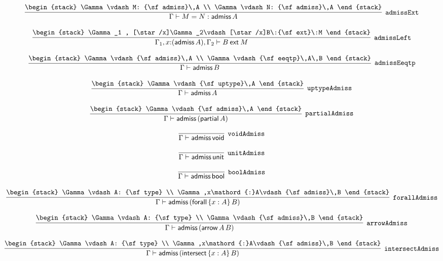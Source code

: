 \[
\infer[{\tt admissExt}]{\Gamma \vdash M= N: {\sf admiss}\,A}{
\begin{stack}
\Gamma \vdash M: {\sf admiss}\,A
\\
\Gamma \vdash N: {\sf admiss}\,A
\end{stack}}
\]

\[
\infer[{\tt admissLeft}]{\Gamma_1 ,x\mathord{:}({\sf admiss}\,A), \Gamma_2 \vdash B\:{\sf ext}\:M}{
\begin{stack}
\Gamma_1 , [\star /x]\Gamma_2\vdash [\star /x]B\:{\sf ext}\:M
\end{stack}}
\]

\[
\infer[{\tt admissEeqtp}]{\Gamma \vdash {\sf admiss}\,B}{
\begin{stack}
\Gamma \vdash {\sf admiss}\,A
\\
\Gamma \vdash {\sf eeqtp}\,A\,B
\end{stack}}
\]

\[
\infer[{\tt uptypeAdmiss}]{\Gamma \vdash {\sf admiss}\,A}{
\begin{stack}
\Gamma \vdash {\sf uptype}\,A
\end{stack}}
\]

\[
\infer[{\tt partialAdmiss}]{\Gamma \vdash {\sf admiss}\,({\sf partial}\,A)}{
\begin{stack}
\Gamma \vdash {\sf admiss}\,A
\end{stack}}
\]

\[
\infer[{\tt voidAdmiss}]{\Gamma \vdash {\sf admiss}\,{\sf void}}{}
\]

\[
\infer[{\tt unitAdmiss}]{\Gamma \vdash {\sf admiss}\,{\sf unit}}{}
\]

\[
\infer[{\tt boolAdmiss}]{\Gamma \vdash {\sf admiss}\,{\sf bool}}{}
\]

\[
\infer[{\tt forallAdmiss}]{\Gamma \vdash {\sf admiss}\,({\sf forall}\,\{x : A\}\,B)}{
\begin{stack}
\Gamma \vdash A: {\sf type}
\\
\Gamma ,x\mathord{:}A\vdash {\sf admiss}\,B
\end{stack}}
\]

\[
\infer[{\tt arrowAdmiss}]{\Gamma \vdash {\sf admiss}\,({\sf arrow}\,A\,B)}{
\begin{stack}
\Gamma \vdash A: {\sf type}
\\
\Gamma \vdash {\sf admiss}\,B
\end{stack}}
\]

\[
\infer[{\tt intersectAdmiss}]{\Gamma \vdash {\sf admiss}\,({\sf intersect}\,\{x : A\}\,B)}{
\begin{stack}
\Gamma \vdash A: {\sf type}
\\
\Gamma ,x\mathord{:}A\vdash {\sf admiss}\,B
\end{stack}}
\]

